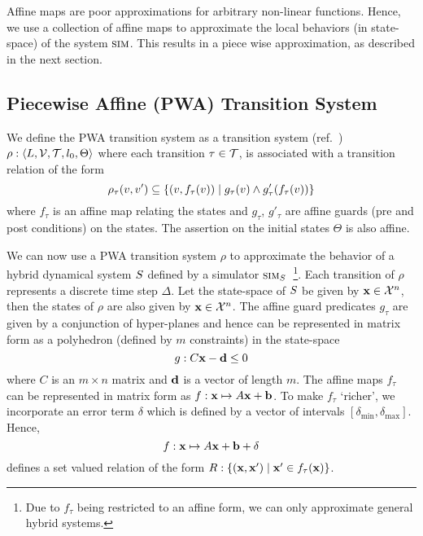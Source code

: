     Affine maps are poor
    approximations for arbitrary non-linear functions. Hence, we use a
    collection of affine maps to approximate the local behaviors (in
    state-space) of the system $\mbox{\sc sim}$. This results in a piece
    wise approximation, as described in the next section.

\subsection{Piecewise Affine (PWA) Transition System}

We define the PWA transition system as a transition system
(ref.~) $\rho:\left\langle L,\mathcal{V},\mathcal{T}, l_0,\Theta \right \rangle$
where each transition $\tau \in \mathcal{T}$, is associated with a
transition relation of the form
\[
    \rho_{\tau}(v,v') \subseteq \{(v,f_{\tau}(v)) \;|\; g_\tau(v) \land g'_\tau(f_{\tau}(v))\}
\]
where $f_{\tau}$ is an affine map relating the states and $g_{\tau}$,
$g'_{\tau}$ are affine guards (pre and post conditions) on the states.
The assertion on the initial states $\Theta$ is also affine.

We can now use a PWA transition system $\rho$ to approximate the
behavior of a hybrid dynamical system $S$ defined by a simulator
$\mbox{\sc sim}_{S}$~\footnote{Due to $f_\tau$ being restricted to an affine
form, we can only approximate general hybrid systems.}. Each
transition of $\rho$ represents a discrete time step $\Delta$. Let the
state-space of $S$ be given by $\mathbf{x}\in\mathcal{X}^n$, then the
states of $\rho$ are also given by $\mathbf{x}\in\mathcal{X}^n$. The affine guard
predicates $g_\tau$ are given by a conjunction of hyper-planes and
hence can be represented in matrix form as a polyhedron (defined by
$m$ constraints) in the state-space
\[
g:C\mathbf{x} - \mathbf{d} \le 0
\]
where $C$ is an $m \times n$ matrix and $\mathbf{d}$ is a vector of length
$m$. The affine maps $f_\tau$ can be represented in matrix form as
$f:\mathbf{x} \mapsto A\mathbf{x}+\mathbf{b}$. To make $f_\tau$ `richer', we incorporate
an error term $\delta$ which is defined by a vector of intervals
$[\delta_{\min},\delta_{\max}]$. Hence,
\[
f:\mathbf{x} \mapsto A\mathbf{x} + \mathbf{b} + \delta
\]
defines a set valued relation of the form $R:\{(\mathbf{x},\mathbf{x}') \;|\; \mathbf{x}'
\in f_\tau(\mathbf{x})\}$.



